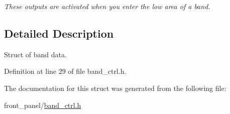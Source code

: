 \begin{CompactItemize}
\begin{CompactList}\small\item\em These outputs are activated when you enter the low area of a band. \item\end{CompactList}\end{CompactItemize}


\subsection{Detailed Description}
Struct of band data. 

Definition at line 29 of file band\_\-ctrl.h.

The documentation for this struct was generated from the following file:\begin{CompactItemize}
\item 
front\_\-panel/\hyperlink{band__ctrl_8h}{band\_\-ctrl.h}\end{CompactItemize}
